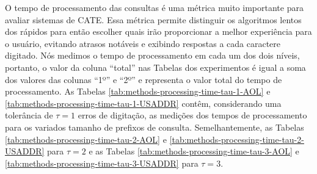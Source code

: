 O tempo de processamento das consultas é uma métrica muito importante para avaliar sistemas de CATE. Essa métrica permite distinguir os algoritmos lentos dos rápidos para então escolher quais irão proporcionar a melhor experiência para o usuário, evitando atrasos notáveis e exibindo respostas a cada caractere digitado. Nós medimos o tempo de processamento em cada um dos dois níveis, portanto, o valor da coluna ``total'' nas Tabelas dos experimentos é igual a soma dos valores das colunas ``1º'' e ``2º'' e representa o valor total do tempo de processamento. As Tabelas \ref{tab:methods-processing-time-tau-1-AOL} e  \ref{tab:methods-processing-time-tau-1-USADDR} contêm, considerando uma tolerância de $\tau=1$ erros de digitação, as medições dos tempos de processamento para os variados tamanho de prefixos de consulta. Semelhantemente, as Tabelas \ref{tab:methods-processing-time-tau-2-AOL} e \ref{tab:methods-processing-time-tau-2-USADDR} para $\tau=2$ e as Tabelas \ref{tab:methods-processing-time-tau-3-AOL} e \ref{tab:methods-processing-time-tau-3-USADDR} para $\tau=3$.

